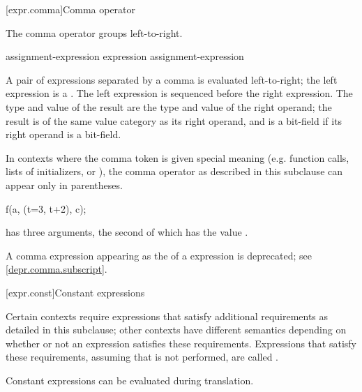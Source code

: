 [expr.comma]{Comma operator}%
%
%
%
%
%

\pnum
The comma operator groups left-to-right.

\begin{bnf}
\br
    assignment-expression\br
    expression \terminal{,} assignment-expression
\end{bnf}

A pair of expressions separated by a comma is evaluated left-to-right;
the left expression is
a .
The left expression is sequenced before
the right expression.
%
The type and value of the
result are the type and value of the right operand; the result is of the same
value category as its right operand, and is a bit-field if its
right operand is a bit-field.

\pnum
\begin{note}
In contexts where the comma token is given special meaning
(e.g. function calls, lists of initializers,
or ),
the comma operator as described in this subclause can appear only in parentheses.
\begin{example}
\begin{codeblock}
f(a, (t=3, t+2), c);
\end{codeblock}
has three arguments, the second of which has the value
.
\end{example}
\end{note}

\pnum
\begin{note}
A comma expression
appearing as the 
of a  expression is deprecated;
see \ref{depr.comma.subscript}.
\end{note}

[expr.const]{Constant expressions}%

\pnum
Certain contexts require expressions that satisfy additional
requirements as detailed in this subclause; other contexts have different
semantics depending on whether or not an expression satisfies these requirements.
Expressions that satisfy these requirements,
assuming that  is not performed,
are called
%
.
\begin{note}
Constant expressions can be evaluated
during translation.
\end{note}

